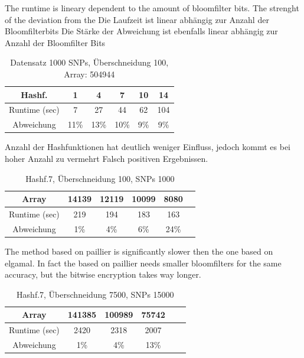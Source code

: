 \documentclass[10pt,a4paper,oneside,twocolumn]{article}
\begin{document}
The runtime is lineary dependent to the amount of bloomfilter bits.
The strenght of the deviation from the 
		 Die Laufzeit ist linear abhängig zur Anzahl der Bloomfilterbits
		 Die Stärke der Abweichung ist ebenfalls linear abhängig zur Anzahl der Bloomfilter Bits


	\begin{table}[h]
		
		\begin{tabular}{c|c|c|c|c|c}
			Hashf.&1&4&7&10&14\\
			\hline
			Runtime (sec)&7&27&44&62&104\\
			Abweichung&11\%&13\%&10\%&9\%&9\%\\
			
			
		\end{tabular}
		\caption{Datensatz 1000 SNPs, Überschneidung 100, Array: 504944 }
		\label{tab:meinetabelle4}
	\end{table}
	
	
	 Anzahl der Hashfunktionen hat deutlich weniger Einfluss, jedoch kommt es bei hoher Anzahl zu vermehrt Falsch positiven Ergebnissen.


	\begin{table}[h]
		
		\begin{tabular}{c|c|c|c|c|c}
			Array&14139&12119&10099&8080\\
			\hline
			Runtime (sec)&219&194&183&163\\
			Abweichung&1\%&4\%&6\%&24\%\\
			
			
		\end{tabular}
		\caption{Hashf.7, Überschneidung 100, SNPs 1000 }
		\label{tab:meinetabelle5}
	\end{table}

The method based on paillier is significantly slower then the one based on elgamal. 
In fact the based on paillier needs smaller bloomfilters for the same accuracy, but the bitwise encryption takes way longer.

	\begin{table}[h]
		
		\begin{tabular}{c|c|c|c|c|c}
			Array&141385&100989&75742\\
			\hline
			Runtime (sec)&2420&2318&2007\\
			Abweichung&1\%&4\%& 13\%\\
			
			
		\end{tabular}
		\caption{Hashf.7, Überschneidung 7500, SNPs 15000 }
		\label{tab:meinetabelle6}
	\end{table}
\end{document}
